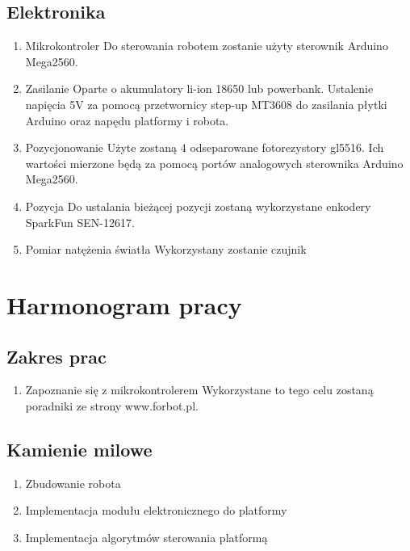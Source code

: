 \documentclass[10pt, a4paper]{article}
\begin{document}
\subsection{Elektronika}
\begin{enumerate}
	\item Mikrokontroler
	\newline
	Do sterowania robotem zostanie użyty sterownik Arduino Mega2560.
	
	\item Zasilanie
	\newline
	Oparte o akumulatory li-ion 18650 lub powerbank. Ustalenie napięcia 5V za pomocą przetwornicy step-up MT3608 do zasilania płytki Arduino oraz napędu platformy i robota.
	
	\item Pozycjonowanie
	\newline
	Użyte zostaną 4 odseparowane fotorezystory gl5516. Ich wartości mierzone będą za pomocą portów analogowych  sterownika Arduino Mega2560.
	
	\item Pozycja
	\newline
	Do ustalania bieżącej pozycji zostaną wykorzystane enkodery SparkFun SEN-12617.
	
	\item Pomiar natężenia światła
	\newline
	Wykorzystany zostanie czujnik
\end{enumerate}

\section{Harmonogram pracy}

\subsection{Zakres prac}
\begin{enumerate}
	\item Zapoznanie się z mikrokontrolerem
	\newline
	Wykorzystane to tego celu zostaną poradniki ze strony www.forbot.pl.
\end{enumerate}
\subsection{Kamienie milowe}
\begin{enumerate}
	\item Zbudowanie robota
	\item Implementacja modułu elektronicznego do platformy
	\item Implementacja algorytmów sterowania platformą
\end{enumerate}
\end{document}
